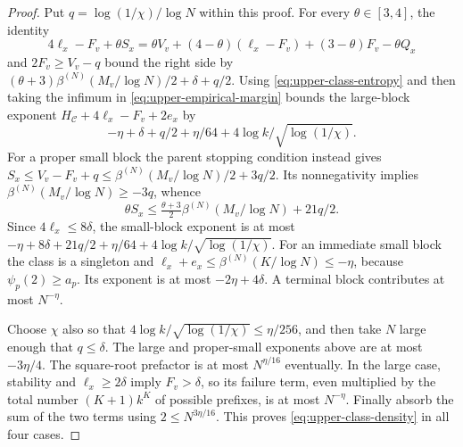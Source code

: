 \documentclass[11pt]{article}
\numberwithin{equation}{section}
\theoremstyle{definition}
\theoremstyle{remark}
\newcommand{\1}{\mathbf 1}
\begin{document}
\begin{proof}
Put $q=\log(1/\chi)/\log N$ within this proof.
For every $\theta\in[3,4]$, the identity
\[
 4\ell_x-F_v+\theta S_x
 =\theta V_v+(4-\theta)(\ell_x-F_v)
                         +(3-\theta)F_v-\theta Q_x
\]
and $2F_v\ge V_v-q$ bound the right side by
$(\theta+3)\beta^{(N)}(M_v/\log N)/2+\delta+q/2$.
Using \eqref{eq:upper-class-entropy} and then taking the infimum
in \eqref{eq:upper-empirical-margin} bounds the large-block exponent
$H_{\mathcal C}+4\ell_x-F_v+2e_x$ by
\[
 -\eta+\delta+q/2+\eta/64+4\log k/\sqrt{\log(1/\chi)}.
\]
For a proper small block the parent stopping condition instead gives
$S_x\le V_v-F_v+q\le\beta^{(N)}(M_v/\log N)/2+3q/2$.
Its nonnegativity implies $\beta^{(N)}(M_v/\log N)\ge-3q$, whence
\[
 \theta S_x\le\tfrac{\theta+3}{2}\beta^{(N)}(M_v/\log N)+21q/2.
\]
Since $4\ell_x\le8\delta$, the small-block exponent is at most
$-\eta+8\delta+21q/2+\eta/64+4\log k/\sqrt{\log(1/\chi)}$.
For an immediate small block the class is a singleton and
$\ell_x+e_x\le\beta^{(N)}(K/\log N)\le-\eta$, because
$\psi_p(2)\ge a_p$. Its exponent is at most $-2\eta+4\delta$.
A terminal block contributes at most $N^{-\eta}$.

Choose $\chi$ also so that
$4\log k/\sqrt{\log(1/\chi)}\le\eta/256$, and then take $N$
large enough that $q\le\delta$. The large and proper-small
exponents above are at most $-3\eta/4$. The square-root prefactor
is at most $N^{\eta/16}$ eventually. In the large case, stability
and $\ell_x\ge2\delta$ imply $F_v>\delta$, so its failure term,
even multiplied by the total number $(K+1)k^K$ of possible prefixes,
is at most $N^{-\eta}$. Finally absorb the sum of the two terms
using $2\le N^{3\eta/16}$. This proves
\eqref{eq:upper-class-density} in all four cases.
\end{proof}
\end{document}

